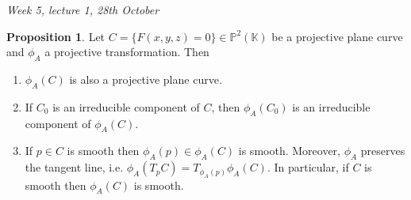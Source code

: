 \documentclass{article}
\newcommand{\K}{\mathbb{K}}
\newcommand{\p}{\mathbb{P}}
\theoremstyle{definition}
\newtheorem{prop}[defn]{Proposition}
\begin{document}
\begin{flushright}
\textit{Week 5, lecture 1, 28th October}
\end{flushright}

\begin{prop}
Let $C=\{F(x,y,z)=0\}\in\p^2(\K)$ be a projective plane curve and $\phi_A$ a projective transformation. Then
\begin{enumerate}
\item $\phi_A(C)$ is also a projective plane curve.
\item If $C_0$ is an irreducible component of $C$, then $\phi_A(C_0)$ is an irreducible component of $\phi_A(C)$.
\item If $p\in C$ is smooth then $\phi_A(p)\in\phi_A(C)$ is smooth. Moreover, $\phi_A$ preserves the tangent line, i.e. $\phi_A(T_pC)=T_{\phi_A(p)}\phi_A(C)$. In particular, if $C$ is smooth then $\phi_A(C)$ is smooth.
\end{enumerate}
\end{prop}
\end{document}
